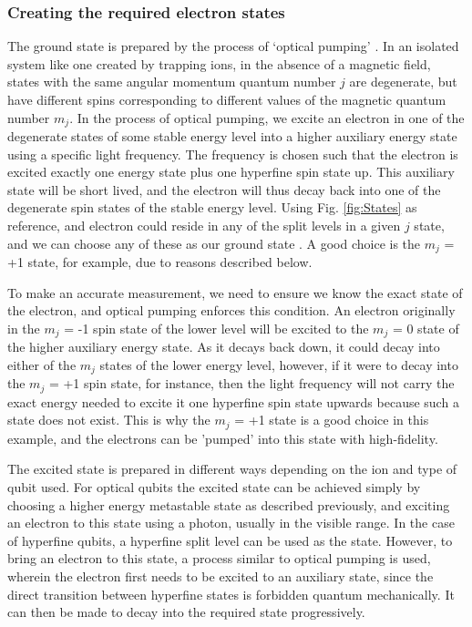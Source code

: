 \subsubsection{Creating the required electron states}
The ground state \kz is prepared by the process of `optical pumping' \cite{albloom}. In an isolated system like one created by trapping ions, in the absence of a magnetic field, states with the same angular momentum quantum number $j$ are degenerate, but have different spins corresponding to different values of the magnetic quantum number $m_j$. In the process of optical pumping, we excite an electron in one of the degenerate states of some stable energy level into a higher auxiliary energy state using a specific light frequency. The frequency is chosen such that the electron is excited exactly one energy state plus one hyperfine spin state up. This auxiliary state will be short lived, and the electron will thus decay back into one of the degenerate spin states of the stable energy level. Using Fig. \ref{fig:States} as reference, and electron could reside in any of the split levels in a given $j$ state, and we can choose any of these as our ground state \kz. A good choice is the $m_j$ = +1 state, for example, due to reasons described below. 

To make an accurate measurement, we need to ensure we know the exact state of the electron, and optical pumping enforces this condition. An electron originally in the $m_j$ = -1 spin state of the lower level will be excited to the $m_j$ = 0 state of the higher auxiliary energy state. As it decays back down, it could decay into either of the $m_j$ states of the lower energy level, however, if it were to decay into the $m_j$ = +1 spin state, for instance, then the light frequency will not carry the exact energy needed to excite it one hyperfine spin state upwards because such a state does not exist. This is why the $m_j$ = +1 state is a good choice in this example, and the electrons can be 'pumped' into this state with high-fidelity. 

The excited state \ko is prepared in different ways depending on the ion and type of qubit used. For optical qubits the excited state can be achieved simply by choosing a higher energy metastable state as described previously, and exciting an electron to this state using a photon, usually in the visible range. In the case of hyperfine qubits, a hyperfine split level can be used as the \ko state. However, to bring an electron to this state, a process similar to optical pumping is used, wherein the electron first needs to be excited to an auxiliary state, since the direct transition between hyperfine states is forbidden quantum mechanically. It can then be made to decay into the required \ko state progressively.

